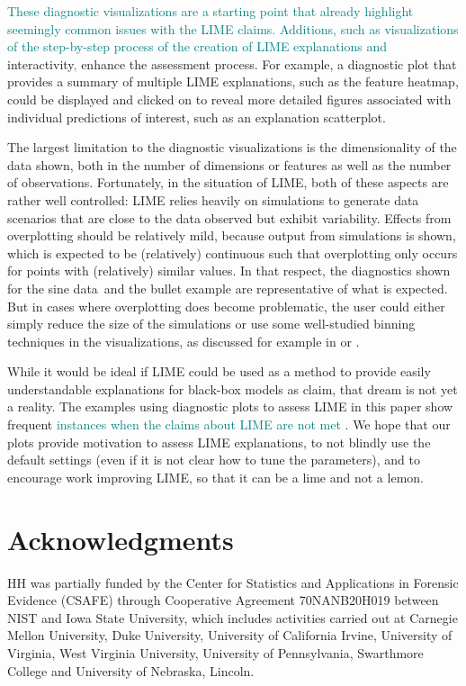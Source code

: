 \documentclass[AMS,STIX2COL]{WileyNJD-v2}\usepackage[]{graphicx}\usepackage[]{color}
\newcommand{\kge}[1]{\textcolor{teal}{#1}}
\newcommand{\data}{sine data}
\renewcommand{\sout}[1]{\unskip}
\begin{document}
\kge{These diagnostic visualizations are a starting point that already highlight seemingly common issues with the LIME claims. Additions, such as visualizations of the step-by-step process of the creation of LIME explanations and} \sout{The addition of} interactivity\kge{,} \sout{to the diagnostic plots would provide additional} enhance\sout{ment of} the assessment process. For example, a diagnostic plot that provides a summary of multiple LIME explanations, such as the feature heatmap, could be displayed and clicked on to reveal more detailed figures associated with individual predictions of interest, such as an explanation scatterplot.

The largest limitation to the diagnostic visualizations is the dimensionality of the data shown, both in the number of dimensions or features as well as the number of observations. Fortunately, in the situation of LIME, both of these aspects are rather well controlled: LIME relies heavily on simulations to generate data scenarios that are close to the data observed but exhibit variability. Effects from overplotting should be relatively mild, because output from simulations is shown, which is expected to be (relatively) continuous such that overplotting only occurs for points with (relatively) similar values. In that respect, the diagnostics shown for the \data \ and the bullet example are representative of what is expected. But in cases where overplotting does become problematic, the user could either simply reduce the size of the simulations or use some well-studied binning techniques in the visualizations, as discussed for example in \citet{carr:1987} or \citet{unwin:2006}. 

While it would be ideal if LIME could be used as a method to provide easily understandable explanations for black-box models as \citet{ribeiro:2016} claim, that dream is not yet a reality. The examples using diagnostic plots to assess LIME in this paper show frequent \kge{instances when the claims about LIME are not met} \sout{issues with LIME}. We hope that our plots provide motivation to assess LIME explanations, to not blindly use the default settings (even if it is not clear how to tune the parameters), and to encourage work \sout{on} improving LIME, so that it can be a lime and not a lemon.

\section*{Acknowledgments}

HH was partially funded by the Center for Statistics and Applications in Forensic Evidence (CSAFE) through Cooperative Agreement 70NANB20H019 between NIST and Iowa State University, which includes activities carried out at Carnegie Mellon University, Duke University, University of California Irvine, University of Virginia, West Virginia University, University of Pennsylvania, Swarthmore College and University of Nebraska, Lincoln.
\end{document}
